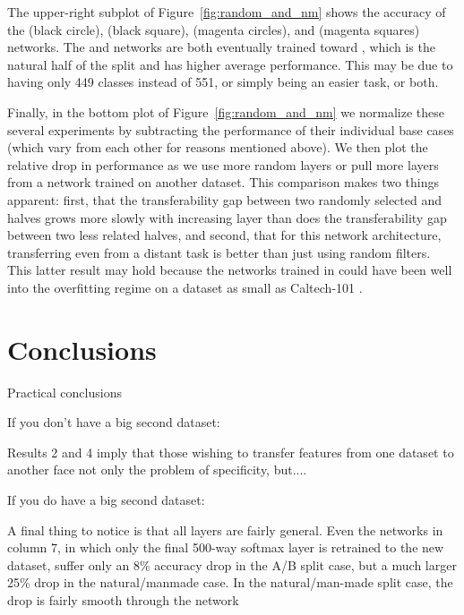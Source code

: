 The upper-right subplot of Figure~\ref{fig:random_and_nm} shows the accuracy of the  (black circle),  (black square),  (magenta circles), and  (magenta squares) networks. The  and  networks are both eventually trained toward \dA, which is the natural half of the split and has higher average performance. This may be due to having only 449 classes instead of 551, or simply being an easier task, or both.

Finally, in the bottom plot of Figure~\ref{fig:random_and_nm} we normalize these several experiments by subtracting the performance of their individual base cases (which vary from each other for reasons mentioned above). We then plot the relative drop in performance as we use more random layers or pull more layers from a network trained on another dataset. This comparison makes two things apparent: first, that the transferability gap between two randomly selected \dA and \dB halves grows more slowly with increasing layer than does the transferability gap between two less related halves, and second, that for this network architecture, transferring even from a distant task is better than just using random filters. This latter result may hold because the networks trained in \citep{Jarrett-ICCV2009} could have been well into the overfitting regime on a dataset as small as Caltech-101 \citep{Fei-Fei.2004}.



\section{Conclusions}



Practical conclusions

If you don't have a big second dataset:

Results 2 and 4 imply that those wishing to transfer features from one dataset to another face not only the problem of specificity, but....



If you do have a big second dataset:




A final thing to notice is that all layers are fairly general. Even the networks in column 7, in which only the final 500-way softmax layer is retrained to the new dataset, suffer only an 8\% accuracy drop in the A/B split case, but a much larger 25\% drop in the natural/manmade case. In the natural/man-made split case, the drop is fairly smooth through the network

